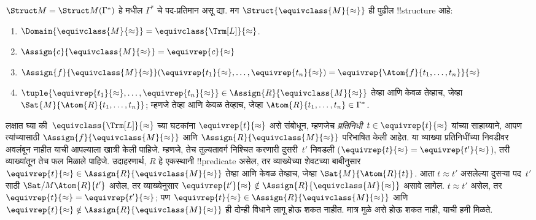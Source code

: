\documentclass[../../../include/open-logic-section]{subfiles}
\begin{document}
\begin{defn}
$\Struct M = \Struct M(\Gamma^*)$ हे  मधील
$\Gamma^*$ चे पद-प्रतिमान असू द्या. मग
$\Struct{\equivclass{M}{\approx}}$ ही पुढील !!{structure} आहे:
\begin{enumerate}
\item $\Domain{\equivclass{M}{\approx}} = \equivclass{\Trm[L]}{\approx}$.
\item $\Assign{c}{\equivclass{M}{\approx}} = \equivrep{c}{\approx}$
\item $\Assign{f}{\equivclass{M}{\approx}}(\equivrep{t_1}{\approx}, \dots,
  \equivrep{t_n}{\approx}) = \equivrep{\Atom{f}{t_1,\dots, t_n}}{\approx}$
\item $\tuple{\equivrep{t_1}{\approx}, \dots, \equivrep{t_n}{\approx}} \in
  \Assign{R}{\equivclass{M}{\approx}}$ तेव्हा आणि केवळ तेव्हाच, जेव्हा
  $\Sat{M}{\Atom{R}{t_1,\dots, t_n}}$; म्हणजे तेव्हा आणि केवळ तेव्हाच,
  जेव्हा $\Atom{R}{t_1,\dots, t_n} \in \Gamma^*$.
\end{enumerate}
\end{defn}

\begin{explain}
लक्षात घ्या की~$\equivclass{\Trm[L]}{\approx}$ च्या घटकांना
$\equivrep{t}{\approx}$ असे संबोधून, म्हणजेच
\emph{प्रतिनिधी}~$t \in \equivrep{t}{\approx}$ यांच्या साहाय्याने,
आपण त्यांच्यासाठी $\Assign{f}{\equivclass{M}{\approx}}$ आणि
$\Assign{R}{\equivclass{M}{\approx}}$ परिभाषित केली आहेत. या व्याख्या
प्रतिनिधींच्या निवडीवर अवलंबून नाहीत याची आपल्याला खात्री केली पाहिजे.
म्हणजे, तेच तुल्यतावर्ग निश्चित करणारी दुसरी~$t'$ निवडली
($\equivrep{t}{\approx} = \equivrep{t'}{\approx}$), तरी व्याख्यांतून तेच
फल मिळाले पाहिजे. उदाहरणार्थ, $R$ हे एकस्थानी !!{predicate} असेल, तर
व्याख्येच्या शेवटच्या बाबीनुसार $\equivrep{t}{\approx} \in
\Assign{R}{\equivclass{M}{\approx}}$ तेव्हा आणि केवळ तेव्हाच, जेव्हा
$\Sat{M}{\Atom{R}{t}}$. आता $t \approx t'$ असलेल्या दुसऱ्या
पद~$t'$ साठी $\Sat/{M}{\Atom{R}{t'}}$ असेल, तर व्याख्येनुसार
$\equivrep{t'}{\approx} \notin \Assign{R}{\equivclass{M}{\approx}}$ असावे
लागेल. $t \approx t'$ असेल, तर $\equivrep{t}{\approx} =
\equivrep{t'}{\approx}$; पण $\equivrep{t}{\approx} \in
\Assign{R}{\equivclass{M}{\approx}}$ आणि $\equivrep{t}{\approx}
\notin \Assign{R}{\equivclass{M}{\approx}}$ ही दोन्ही विधाने लागू होऊ
शकत नाहीत. मात्र  मुळे असे होऊ शकत नाही, याची
हमी मिळते.
%
\end{explain}
\end{document}
